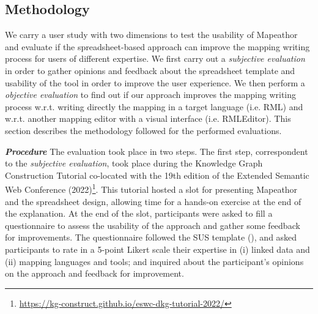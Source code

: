 \subsection{Methodology}
\label{sec:chp5_mapeathor_eval_method}

We carry a user study with two dimensions to test the usability of Mapeathor and evaluate if the spreadsheet-based approach can improve the mapping writing process for users of different expertise. We first carry out a \textit{subjective evaluation} in order to gather opinions and feedback about the spreadsheet template and usability of the tool in order to improve the user experience. We then perform a \textit{objective evaluation} to find out if our approach improves the mapping writing process w.r.t. writing directly the mapping in a target language (i.e. RML) and w.r.t. another mapping editor with a visual interface (i.e. RMLEditor). This section describes the methodology followed for the performed evaluations.



\noindent\textit{\textbf{Procedure}} The evaluation took place in two steps. The first step, correspondent to the \textit{subjective evaluation}, took place during the Knowledge Graph Construction Tutorial co-located with the 19th edition of the Extended Semantic Web Conference (2022)\footnote{\url{https://kg-construct.github.io/eswc-dkg-tutorial-2022/}}. This tutorial hosted a slot for presenting Mapeathor and the spreadsheet design, allowing time for a hands-on exercise at the end of the explanation. At the end of the slot, participants were asked to fill a questionnaire to assess the usability of the approach and gather some feedback for improvements. The questionnaire followed the SUS template (), and asked participants to rate in a 5-point Likert scale their expertise in (i) linked data and (ii) mapping languages and tools; and inquired about the participant's opinions on the approach and feedback for improvement.

